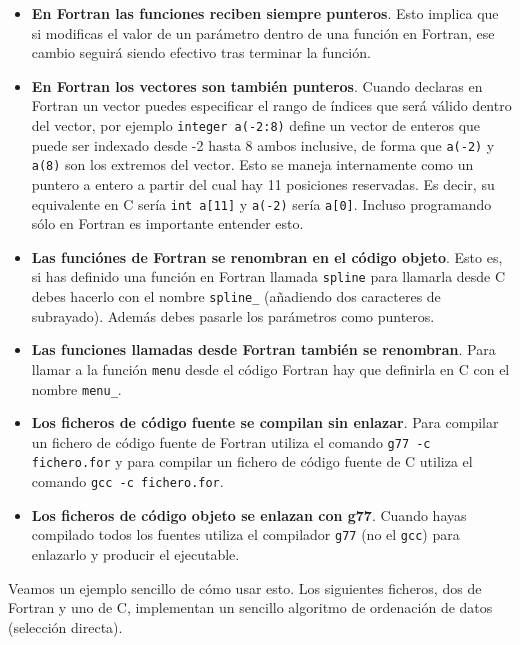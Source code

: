 \begin{itemize}

\item {\bf  En  Fortran las funciones reciben siempre  punteros}. Esto
implica  que si  modificas  el valor  de un  parámetro  dentro de  una
función en Fortran,  ese cambio seguirá siendo  efectivo tras terminar
la función.

\item  {\bf En  Fortran  los vectores  son  también punteros}.  Cuando
declaras en Fortran  un vector puedes especificar el  rango de índices
que será válido  dentro del vector, por ejemplo  {\tt integer a(-2:8)}
define un  vector de enteros que  puede ser indexado desde  -2 hasta 8
ambos  inclusive, de  forma  que  {\tt a(-2)}  y  {\tt  a(8)} son  los
extremos del  vector. Esto  se maneja internamente  como un  puntero a
entero a  partir del cual hay  11 posiciones reservadas. Es  decir, su
equivalente en C sería {\tt int a[11]} y {\tt a(-2)} sería {\tt a[0]}.
Incluso programando sólo en Fortran es importante entender esto.

\item {\bf Las funciónes de Fortran se renombran en el código objeto}.
Esto es, si  has definido una función en Fortran  llamada {\tt spline}
para  llamarla desde  C debes  hacerlo  con el  nombre {\tt  spline\_}
(añadiendo  dos caracteres  de  subrayado). Además  debes pasarle  los
parámetros como punteros.

\item {\bf Las funciones llamadas desde Fortran también se renombran}.
Para llamar  a la función {\tt  menu} desde el código  Fortran hay que
definirla en C con el nombre {\tt menu\_}.

\item {\bf  Los ficheros  de código fuente  se compilan  sin enlazar}.
Para  compilar un  fichero  de  código fuente  de  Fortran utiliza  el
comando {\tt g77 -c fichero.for} y  para compilar un fichero de código
fuente de C utiliza el comando {\tt gcc -c fichero.for}.

\item {\bf Los  ficheros de código objeto se enlazan  con g77}. Cuando
hayas compilado todos los fuentes  utiliza el compilador {\tt g77} (no
el {\tt gcc}) para enlazarlo y producir el ejecutable.

\end{itemize}

Veamos un ejemplo sencillo de cómo usar esto. Los siguientes ficheros,
dos  de Fortran  y  uno de  C, implementan  un  sencillo algoritmo  de
ordenación de datos (selección directa). 

